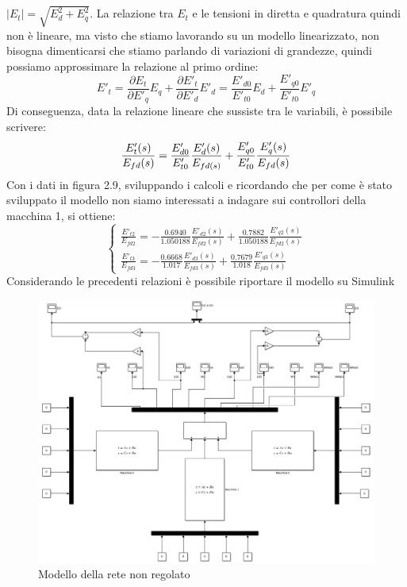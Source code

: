 \documentclass[Lau,noexaminfo]{sapthesis}
\begin{document}
	$|E_t|=\sqrt{E_d^2+E_q^2}$. La relazione tra $E_t$ e le tensioni in diretta e quadratura quindi non è lineare, ma visto che stiamo lavorando su un modello linearizzato, non bisogna dimenticarsi che stiamo parlando di variazioni di grandezze, quindi possiamo approssimare la relazione al primo ordine:\\
	\begin{equation*}
	E'_t=\frac{\partial E_t}{\partial E'_q}E_q+\frac{\partial E'_t}{\partial E'_d}E'_d= \frac{E'_{d0}}{E'_{t0}}E_d+\frac{E'_{q0}}{E'_{t0}}E'_q
	\end{equation*}
	Di conseguenza, data la relazione lineare che sussiste tra le variabili, è possibile scrivere:
	\begin{equation}
	\frac{E'_t(s)}{E_{fd}(s)}=\frac{E'_{d0}}{E'_{t0}}\frac{E'_d(s)}
	{E_{fd(s)}}+\frac{E'_{q0}}{E'_{t0}}\frac{E'_q(s)}{E_{fd}(s)}\\
	\end{equation}
	Con i dati in figura 2.9, sviluppando i calcoli e ricordando che per come è stato sviluppato il modello non siamo interessati a indagare sui controllori della macchina 1, si ottiene:\\
	\begin{equation*}
	\begin{cases}
	\frac{E'_{t2}}{E_{fd2}}=-\frac{0.6940}{1.050188}\frac{E'_{d2}(s)}{E_{fd2}(s)}+\frac{0.7882}{1.050188}\frac{E'_{q2}(s)}{E_{fd2}(s)}\\
	\frac{E'_{t3}}{E_{fd3}}=-\frac{0.6668}{1.017}\frac{E'_{d3}(s)}{E_{fd3}(s)}+\frac{0.7679}{1.018}\frac{E'_{q3}(s)}{E_{fd3}(s)}
	\end{cases}
	\end{equation*}
	Considerando le precedenti relazioni è possibile riportare il modello su Simulink
	\begin{figure}
		\centering
		\includegraphics[height=0.6\textheight,angle=-90]{Macchina_non_regolata}
		\caption{Modello della rete non regolato}
	\end{figure}
\end{document}
